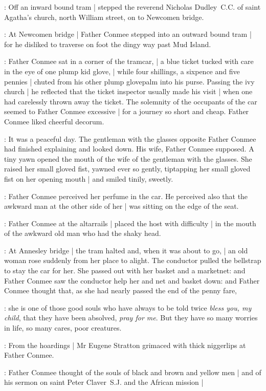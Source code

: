 :
Off an inward bound tram |
stepped the reverend Nicholas Dudley~C.C.
of saint Agatha's church, north William street,
on to Newcomen bridge.

:
At Newcomen bridge |
Father Conmee stepped into an outward bound tram |
for he disliked to traverse on foot the dingy way past Mud Island.

:
Father Conmee sat in a corner of the tramcar, |
a blue ticket tucked with care in the eye of one plump kid glove, |
while four shillings, a sixpence and five pennies |
chuted from his other plump glovepalm into his purse.
Passing the ivy church |
he reflected that the ticket inspector usually made his visit |
when one had carelessly thrown away the ticket.
The solemnity of the occupants of the car
seemed to Father Conmee excessive |
for a journey so short and cheap.
Father Conmee liked cheerful decorum.

:
It was a peaceful day.
The gentleman with the glasses opposite Father Conmee
had finished explaining and looked down.
His wife, Father Conmee supposed.
A tiny yawn opened the mouth of the wife of the gentleman with the glasses.
She raised her small gloved fist,
yawned ever so gently,
tiptapping her small gloved fist on her opening mouth |
and smiled tinily, sweetly.

:
Father Conmee perceived her perfume in the car.
He perceived also that the awkward man at the other side of her |
was sitting on the edge of the seat.%

:
Father Conmee at the altarrails |
placed the host with difficulty |
in the mouth of the awkward old man who had the shaky head.

:
At Annesley bridge |
the tram halted and, when it was about to go, |
an old woman rose suddenly from her place to alight.
The conductor pulled the bellstrap to stay the car for her.
She passed out with her basket and a marketnet:
and Father Conmee saw the conductor help her and net and basket down:
and Father Conmee thought
that, as she had nearly passed the end of the penny fare,

\conmeeint:
she is one of those good souls who have always to be told twice
\emph{bless you, my child},
that they have been absolved,
\emph{pray for me}.
But they have so many worries in life,
so many cares, poor creatures.

:
From the hoardings |
Mr Eugene Stratton grimaced with thick niggerlips at Father Conmee.

:
Father Conmee thought of the souls of black and brown and yellow men |
and of his sermon on saint Peter Claver~S.J. and the African mission |

